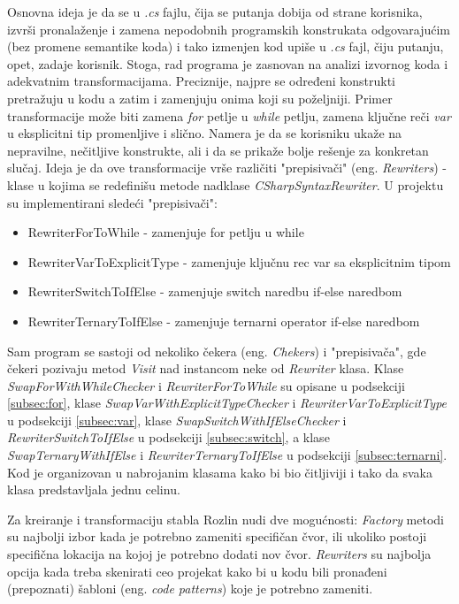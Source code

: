 \documentclass[a4paper]{article}
\begin{document}
{Osnovna ideja je da se u \textit{.cs} fajlu, čija se putanja dobija od strane korisnika, izvrši pronalaženje i zamena nepodobnih programskih konstrukata odgovarajućim (bez promene semantike koda) i tako izmenjen kod upiše u \textit{.cs} fajl, čiju putanju, opet, zadaje korisnik. Stoga, rad programa je zasnovan na analizi izvornog koda i adekvatnim transformacijama. Preciznije, najpre se određeni konstrukti pretražuju u kodu a zatim i zamenjuju onima koji su poželjniji. Primer transformacije može biti zamena \textit{for} petlje u \textit{while} petlju, zamena ključne reči \textit{var} u eksplicitni tip promenljive i slično. Namera je da se korisniku ukaže na nepravilne, nečitljive konstrukte, ali i da se prikaže bolje rešenje za konkretan slučaj. Ideja je da ove transformacije vrše različiti "prepisivači" (eng. \textit{Rewriters}) - klase u kojima se redefinišu metode nadklase \textit{CSharpSyntaxRewriter}. U projektu su implementirani sledeći "prepisivači":
\begin{itemize}
\item RewriterForToWhile - zamenjuje for petlju u while
\item RewriterVarToExplicitType - zamenjuje ključnu rec var sa eksplicitnim tipom
\item RewriterSwitchToIfElse - zamenjuje switch naredbu if-else naredbom
\item RewriterTernaryToIfElse - zamenjuje ternarni operator if-else naredbom
\end{itemize}

Sam program se sastoji od nekoliko čekera (eng. \textit{Chekers}) i "prepisivača", gde čekeri pozivaju metod \textit{Visit} nad instancom neke od \textit{Rewriter} klasa. Klase \textit{SwapForWithWhileChecker} i \textit{RewriterForToWhile} su opisane u podsekciji \ref{subsec:for}, klase \textit{SwapVarWithExplicitTypeChecker} i \textit{RewriterVarToExplicitType} u podsekciji \ref{subsec:var}, klase \textit{SwapSwitchWithIfElseChecker} i \textit{RewriterSwitchToIfElse} u podsekciji \ref{subsec:switch}, a klase \textit{SwapTernaryWithIfElse} i \textit{RewriterTernaryToIfElse} u podsekciji \ref{subsec:ternarni}. Kod je organizovan u nabrojanim klasama kako bi bio čitljiviji i tako da svaka klasa predstavljala jednu celinu.

Za kreiranje i transformaciju stabla Rozlin nudi dve mogućnosti: \textit{Factory} metodi su najbolji izbor kada je potrebno zameniti specifičan čvor, ili ukoliko postoji specifična lokacija na kojoj je potrebno dodati nov čvor. \textit{Rewriters} su najbolja opcija kada treba skenirati ceo projekat kako bi u kodu bili pronađeni (prepoznati) šabloni (eng. \textit{code patterns}) koje je potrebno zameniti.

}
\end{document}
